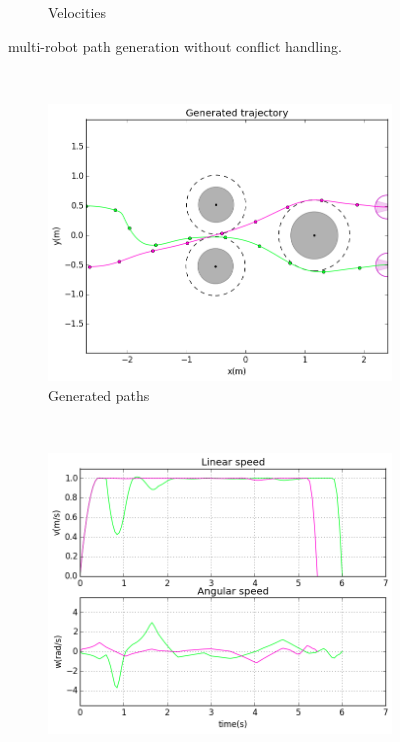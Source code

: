 \begin{figure}[!h]
\begin{subfigure}[b]{0.48\textwidth}
                \caption{Velocities}\label{fig:vwc}
        \end{subfigure}
        \caption{multi-robot path generation without conflict handling.}\label{fig:wc}
\end{figure}

\begin{figure}[!h]
        \centering
        ~ %
        \begin{subfigure}[b]{0.48\textwidth}
                \includegraphics[width=\textwidth]{./images/pnc.png}
                \caption{Generated paths}\label{fig:pnc}
        \end{subfigure}
        ~ %
        \begin{subfigure}[b]{0.48\textwidth}
                \includegraphics[width=\textwidth]{./images/vnc.png}

\end{subfigure}
\end{figure}
